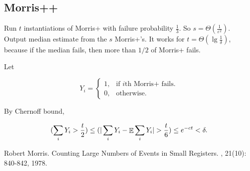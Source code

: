 \documentclass[11pt]{article}
\DeclareMathOperator*{\E}{\mathbb{E}}
\let\Pr\relax
\DeclareMathOperator*{\Pr}{\mathbb{P}}
\begin{document}
\subsection{Morris++}

Run $t$ instantiations of Morris+ with failure probability $\frac{1}{3}$. So $s=\Theta(\frac{1}{\varepsilon^2})$. Output median estimate from the $s$ Morris+'s. It works for $t=\Theta(\lg \frac{1}{\delta})$, because if the median fails, then more than $1/2$ of Morris+ fails.

Let 

\begin{equation}
  Y_i=\begin{cases}
    1, & \text{if $i$th Morris+ fails.}\\
    0, & \text{otherwise}.
  \end{cases}
\end{equation}

By Chernoff bound, 

\begin{align}
\Pr(\sum_i{Y_i}>\frac{t}{2})\le \Pr(|\sum_i Y_i-\E \sum_i Y_i|>\frac{t}{6})\le e^{-ct}<\delta.
\end{align}



\begin{thebibliography}{42}

Robert Morris.
\newblock Counting Large Numbers of Events in Small Registers.
, 21(10): 840-842, 1978.

\end{thebibliography}
\end{document}
